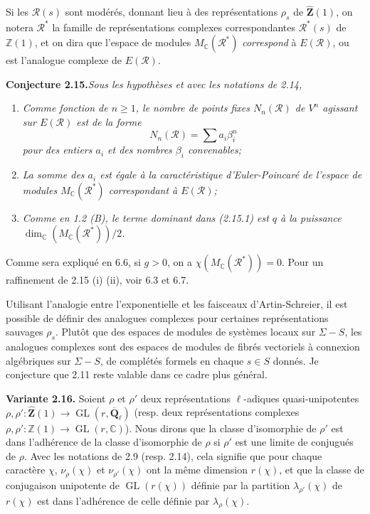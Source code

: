 \documentclass[11pt]{article}
\newcommand{\Qbl}{\overline{\mathbf{Q}}_{\ell}}
\newcommand{\GL}{\operatorname{GL}}
\newcommand{\Z}{\mathbb{Z}}
\newcommand{\Zhat}{\widehat{\mathbf{Z}}}
\newcommand{\C}{\mathbb{C}}
\newcommand{\Rcal}{\mathcal{R}}
\newcommand{\para}[1]{\medskip\noindent\textbf{#1}\enspace}
\begin{document}
Si les \(\Rcal(s)\) sont modérés, donnant lieu à des représentations \(\rho_s\) de \(\Zhat(1)\), on notera \(\Rcal^*\) la famille de représentations complexes correspondantes \(\Rcal^*(s)\) de \(\Z(1)\), et on dira que l'espace de modules \(M_\C(\Rcal^*)\) \textit{correspond} à \(E(\Rcal)\), ou est l'analogue complexe de \(E(\Rcal)\).

\noindent\textbf{Conjecture 2.15.}\quad\textit{Sous les hypothèses et avec les notations de 2.14,}
\begin{enumerate}[label=(\roman*),leftmargin=2.2em]
\item \textit{Comme fonction de \(n\geq 1\), le nombre de points fixes \(N_n(\Rcal)\) de \(V^n\) agissant sur \(E(\Rcal)\) est de la forme}
\begin{equation}
N_n(\Rcal)=\sum a_i\beta_i^n
\tag{2.11.1}
\end{equation}
\textit{pour des entiers \(a_i\) et des nombres \(\beta_i\) convenables;}
\item \textit{La somme des \(a_i\) est égale à la caractéristique d'Euler-Poincaré de l'espace de modules \(M_\C(\Rcal^*)\) correspondant à \(E(\Rcal)\);}
\item \textit{Comme en 1.2 (B), le terme dominant dans (2.15.1) est \(q\) à la puissance \(\dim_\C(M_\C(\Rcal^*))/2\).}
\end{enumerate}

Comme sera expliqué en 6.6, si \(g>0\), on a \(\chi(M_\C(\Rcal^*))=0\). Pour un raffinement de 2.15 (i) (ii), voir 6.3 et 6.7.

Utilisant l'analogie entre l'exponentielle et les faisceaux d'Artin-Schreier, il est possible de définir des analogues complexes pour certaines représentations sauvages \(\rho_s\). Plutôt que des espaces de modules de systèmes locaux sur \(\Sigma-S\), les analogues complexes sont des espaces de modules de fibrés vectoriels à connexion algébriques sur \(\Sigma-S\), de complétés formels en chaque \(s\in S\) donnés. Je conjecture que 2.11 reste valable dans ce cadre plus général.

\para{Variante 2.16.} Soient \(\rho\) et \(\rho'\) deux représentations \(\ell\)-adiques quasi-unipotentes \(\rho,\rho':\Zhat(1)\to\GL(r,\Qbl)\) (resp. deux représentations complexes \(\rho,\rho':\Z(1)\to\GL(r,\C)\)). Nous dirons que la classe d'isomorphie de \(\rho'\) est dans l'adhérence de la classe d'isomorphie de \(\rho\) si \(\rho'\) est une limite de conjugués de \(\rho\). Avec les notations de 2.9 (resp. 2.14), cela signifie que pour chaque caractère \(\chi\), \(\nu_\rho(\chi)\) et \(\nu_{\rho'}(\chi)\) ont la même dimension \(r(\chi)\), et que la classe de conjugaison unipotente de \(\GL(r(\chi))\) définie par la partition \(\lambda_{\rho'}(\chi)\) de \(r(\chi)\) est dans l'adhérence de celle définie par \(\lambda_\rho(\chi)\).
\end{document}
